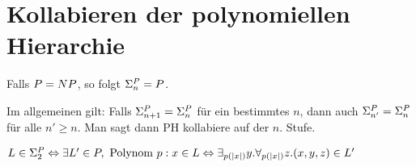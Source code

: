 \section{Kollabieren der polynomiellen Hierarchie}



Falls $P = NP$, so folgt $\Sigma_n^{P} = P$.

Im allgemeinen gilt: Falls $\Sigma_{n+1}^{P} = \Sigma_n^{P}$ für ein bestimmtes $n$, dann auch $\Sigma_{n'}^{P} = \Sigma_n^{P}$ für alle $n' \geq n$. Man sagt dann PH kollabiere auf der $n$. Stufe.







\begin{satz}
    
    $L \in \Sigma_2^{P} \Leftrightarrow \\
    \exists L' \in P, \text{ Polynom } p:
    x \in L \Leftrightarrow \exists_{p(|x|)} y . \forall_{p(|x|)} z . (x,y,z) \in L'$

\end{satz}

